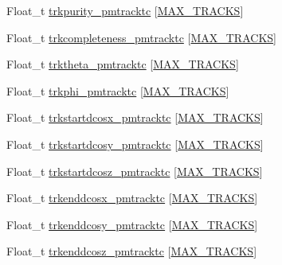 \begin{DoxyCompactItemize}
\item 
Float\-\_\-t \hyperlink{classanatree_a153f631b584b3b365349b970e5851bc8}{trkpurity\-\_\-pmtracktc} \mbox{[}\hyperlink{anatree__core__v09410002_8h_a327fd4e796e4a0d78947524c96e4362e}{M\-A\-X\-\_\-\-T\-R\-A\-C\-K\-S}\mbox{]}
\item 
Float\-\_\-t \hyperlink{classanatree_a824acc5847e9cc75ff10cf27b9f29d0d}{trkcompleteness\-\_\-pmtracktc} \mbox{[}\hyperlink{anatree__core__v09410002_8h_a327fd4e796e4a0d78947524c96e4362e}{M\-A\-X\-\_\-\-T\-R\-A\-C\-K\-S}\mbox{]}
\item 
Float\-\_\-t \hyperlink{classanatree_ae37bd05d4845c918a19b092f6f3b0e77}{trktheta\-\_\-pmtracktc} \mbox{[}\hyperlink{anatree__core__v09410002_8h_a327fd4e796e4a0d78947524c96e4362e}{M\-A\-X\-\_\-\-T\-R\-A\-C\-K\-S}\mbox{]}
\item 
Float\-\_\-t \hyperlink{classanatree_a99ac97914c8806704d7f80ae01d003a1}{trkphi\-\_\-pmtracktc} \mbox{[}\hyperlink{anatree__core__v09410002_8h_a327fd4e796e4a0d78947524c96e4362e}{M\-A\-X\-\_\-\-T\-R\-A\-C\-K\-S}\mbox{]}
\item 
Float\-\_\-t \hyperlink{classanatree_ac4dd1f89a416b66137d08d095bc95924}{trkstartdcosx\-\_\-pmtracktc} \mbox{[}\hyperlink{anatree__core__v09410002_8h_a327fd4e796e4a0d78947524c96e4362e}{M\-A\-X\-\_\-\-T\-R\-A\-C\-K\-S}\mbox{]}
\item 
Float\-\_\-t \hyperlink{classanatree_af63bd0dbe683b30ccf1882e5fda858f0}{trkstartdcosy\-\_\-pmtracktc} \mbox{[}\hyperlink{anatree__core__v09410002_8h_a327fd4e796e4a0d78947524c96e4362e}{M\-A\-X\-\_\-\-T\-R\-A\-C\-K\-S}\mbox{]}
\item 
Float\-\_\-t \hyperlink{classanatree_a6b97cf78b767eed767cb559aec37e65c}{trkstartdcosz\-\_\-pmtracktc} \mbox{[}\hyperlink{anatree__core__v09410002_8h_a327fd4e796e4a0d78947524c96e4362e}{M\-A\-X\-\_\-\-T\-R\-A\-C\-K\-S}\mbox{]}
\item 
Float\-\_\-t \hyperlink{classanatree_a7066a3aeab48d8c18b61cefebb0180f5}{trkenddcosx\-\_\-pmtracktc} \mbox{[}\hyperlink{anatree__core__v09410002_8h_a327fd4e796e4a0d78947524c96e4362e}{M\-A\-X\-\_\-\-T\-R\-A\-C\-K\-S}\mbox{]}
\item 
Float\-\_\-t \hyperlink{classanatree_a674ba281b17125d64e8cdbfb9b184dfc}{trkenddcosy\-\_\-pmtracktc} \mbox{[}\hyperlink{anatree__core__v09410002_8h_a327fd4e796e4a0d78947524c96e4362e}{M\-A\-X\-\_\-\-T\-R\-A\-C\-K\-S}\mbox{]}
\item 
Float\-\_\-t \hyperlink{classanatree_abadcd4b5472c86ce857cb3813afab6be}{trkenddcosz\-\_\-pmtracktc} \mbox{[}\hyperlink{anatree__core__v09410002_8h_a327fd4e796e4a0d78947524c96e4362e}{M\-A\-X\-\_\-\-T\-R\-A\-C\-K\-S}\mbox{]}

\end{DoxyCompactItemize}
